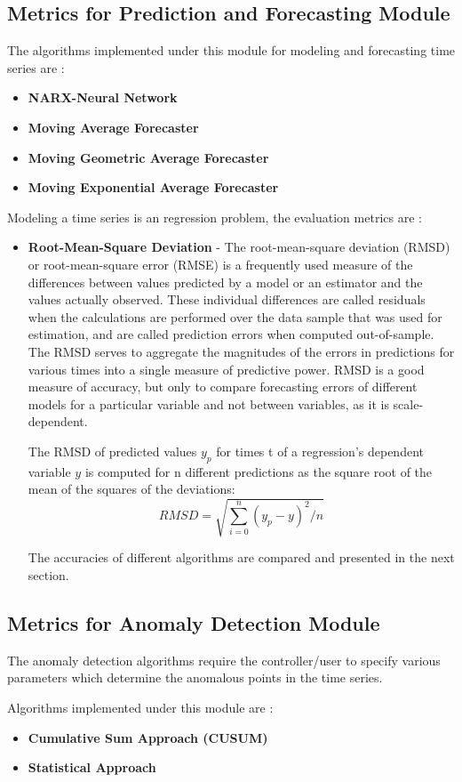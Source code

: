 \documentclass[12pt]{report}
\begin{document}
\subsection{Metrics for Prediction and Forecasting Module}
The algorithms implemented under this module for modeling and forecasting time series are :
\begin{itemize}
\item \textbf{NARX-Neural Network}
\item \textbf{Moving Average Forecaster}
\item \textbf{Moving Geometric Average Forecaster}
\item \textbf{Moving Exponential Average Forecaster}
\end{itemize}
Modeling a time series is an regression problem, the evaluation metrics are :
\begin{itemize}
\item \textbf{Root-Mean-Square Deviation} - The root-mean-square deviation (RMSD) or root-mean-square error (RMSE) is a frequently used measure of the differences between values predicted by a model or an estimator and the values actually observed. These individual differences are called residuals when the calculations are performed over the data sample that was used for estimation, and are called prediction errors when computed out-of-sample. The RMSD serves to aggregate the magnitudes of the errors in predictions for various times into a single measure of predictive power. RMSD is a good measure of accuracy, but only to compare forecasting errors of different models for a particular variable and not between variables, as it is scale-dependent.




The RMSD of predicted values $y_p$ for times t of a regression's dependent variable $y$ is computed for n different predictions as the square root of the mean of the squares of the deviations:
$$RMSD=\sqrt{\sum_{i=0}^{n}{(y_p-y)^2/n}}$$

The accuracies  of different algorithms are compared and presented in the next section.
\end{itemize}
\subsection{Metrics for Anomaly Detection  Module}
The anomaly detection algorithms require the controller/user to specify various parameters which determine the anomalous points in the time series.


Algorithms implemented under this module are :
\begin{itemize}
\item \textbf{Cumulative Sum Approach (CUSUM)}
\item \textbf{Statistical Approach}
\end{itemize}
\end{document}
